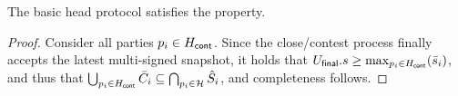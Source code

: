 \begin{lemma}[Completeness]
 \label{lem:completeness}
 The basic head protocol satisfies the 
 property.
\end{lemma}
\begin{proof}
  Consider all parties $p_i\in H_{\mathsf{cont}}$. Since the close/contest process
  finally accepts the latest multi-signed snapshot, it holds that
  $U_{\mathsf{final}}.s \geq \max_{p_i\in H_{\mathsf{cont}}}(\bar s_i)$, and thus that
  $\bigcup_{p_i\in H_{\mathsf{cont}}}\bar{C}_i\subseteq\bigcap_{p_i\in\mathcal H}\hat{S}_i$,
  and completeness follows.
\end{proof}

